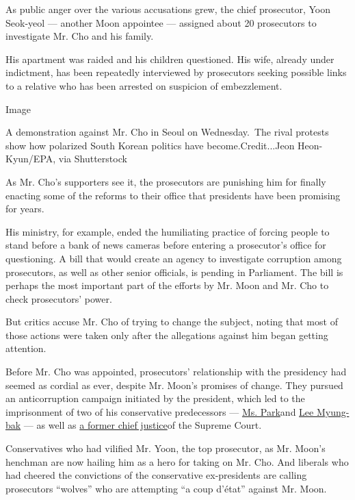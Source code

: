 As public anger over the various accusations grew, the chief prosecutor,
Yoon Seok-yeol --- another Moon appointee --- assigned about 20
prosecutors to investigate Mr. Cho and his family.

His apartment was raided and his children questioned. His wife, already
under indictment, has been repeatedly interviewed by prosecutors seeking
possible links to a relative who has been arrested on suspicion of
embezzlement.

Image

A demonstration against Mr. Cho in Seoul on Wednesday.~The rival
protests show how polarized South Korean politics have
become.Credit...Jeon Heon-Kyun/EPA, via Shutterstock

As Mr. Cho's supporters see it, the prosecutors are punishing him for
finally enacting some of the reforms to their office that presidents
have been promising for years.

His ministry, for example, ended the humiliating practice of forcing
people to stand before a bank of news cameras before entering a
prosecutor's office for questioning. A bill that would create an agency
to investigate corruption among prosecutors, as well as other senior
officials, is pending in Parliament. The bill is perhaps the most
important part of the efforts by Mr. Moon and Mr. Cho to check
prosecutors' power.

But critics accuse Mr. Cho of trying to change the subject, noting that
most of those actions were taken only after the allegations against him
began getting attention.

Before Mr. Cho was appointed, prosecutors' relationship with the
presidency had seemed as cordial as ever, despite Mr. Moon's promises of
change. They pursued an anticorruption campaign initiated by the
president, which led to the imprisonment of two of his conservative
predecessors ---
\href{https://www.nytimes3xbfgragh.onion/2018/08/24/world/asia/park-geun-hye-sentenced-south-korea.html}{Ms.
Park}and
\href{http://nytimes3xbfgragh.onion/2018/10/05/world/asia/lee-myung-bak-south-korea-convicted.html}{Lee
Myung-bak} --- as well as
\href{https://www.nytimes3xbfgragh.onion/2019/01/23/world/asia/south-korea-chief-justice-japan.html}{a
former chief justice}of the Supreme Court.

Conservatives who had vilified Mr. Yoon, the top prosecutor, as Mr.
Moon's henchman are now hailing him as a hero for taking on Mr. Cho. And
liberals who had cheered the convictions of the conservative
ex-presidents are calling prosecutors ``wolves'' who are attempting ``a
coup d'état'' against Mr. Moon.

